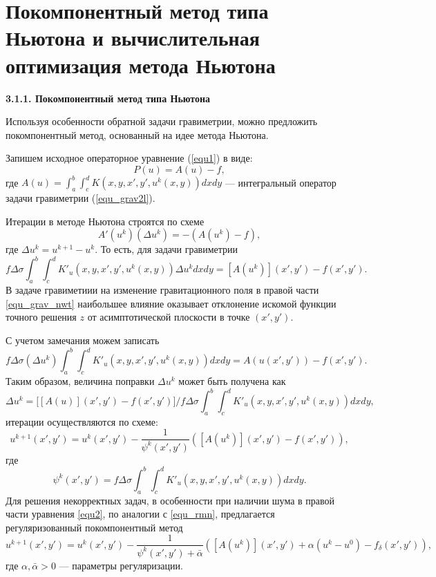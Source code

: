 \newpage

\section{Покомпонентный метод типа Ньютона и вычислительная оптимизация метода Ньютона}

{\bfseries 3.1.1. Покомпонентный метод типа Ньютона}

Используя особенности обратной задачи гравиметрии, можно предложить покомпонентный метод, основанный на идее метода Ньютона.

Запишем исходное операторное уравнение (\ref{equ1}) в виде:
$$P(u)=A(u)-f,$$
где $A(u)=\int_{a}^{b}\int_{c}^{d}K(x,y, x',y',u^k(x,y))dxdy$ --- интегральный оператор задачи гравиметрии (\ref{equ_grav2l}).

Итерации в методе Ньютона строятся по схеме
$$A'(u^k)(\Delta u^k)=-(A(u^k)-f),$$ где $\Delta u^k=u^{k+1}-u^k$.
То есть, для задачи гравиметрии
\begin{equation}\label{equ_grav_nwt}
f\Delta\sigma\int_{a}^{b}\int_{c}^{d}K'_u(x,y, x',y',u^k(x,y))\Delta u^k dxdy=[A(u^k)](x',y')-f(x',y').
\end{equation}
{\remark В задаче гравиметиии на изменение гравитационного поля в правой части \eqref{equ_grav_nwt} наибольшее влияние оказывает отклонение искомой функции точного решения $z$ от асимптотической плоскости в точке $(x',y')$. }

С учетом замечания можем записать
\begin{equation}\label{comp_newt_meth_step1}
f\Delta\sigma(\Delta u^k)\int_{a}^{b}\int_{c}^{d}K'_u(x,y, x',y',u^k(x,y)) dxdy=A(u(x',y'))-f(x',y').
\end{equation}
Таким образом, величина поправки $\Delta u^k$ может быть получена как
$$\Delta u^k=\bigg[[A(u)](x',y')-f(x',y')\bigg]\bigg/f\Delta\sigma\int_{a}^{b}\int_{c}^{d}K'_u(x,y, x',y',u^k(x,y)) dxdy,$$ 
итерации осуществляются по схеме:
\begin{equation}\label{comp_newt_meth}
u^{k+1}(x',y')=u^k(x',y')-\frac{1}{\psi^k(x',y')}([A(u^k)](x',y')-f(x',y')),
\end{equation}
где $$\psi^k(x',y')=f\Delta\sigma\int_{a}^{b}\int_{c}^{d}K'_u(x,y, x',y',u^k(x,y)) dxdy.$$
Для решения некорректных задач, в особенности при наличии шума в правой части уравнения \eqref{equ2}, по аналогии с \eqref{equ_rmn}, предлагается регуляризованный покомпонентный метод
\begin{equation}\label{rcomp_newt_meth}
u^{k+1}(x',y')=u^k(x',y')-\frac{1}{\psi^k(x',y')+\bar\alpha}([A(u^k)](x',y') + \alpha(u^k-u^0)-f_\delta(x',y')),
\end{equation}
где $\alpha, \bar{\alpha} > 0$ --- параметры регуляризации.

